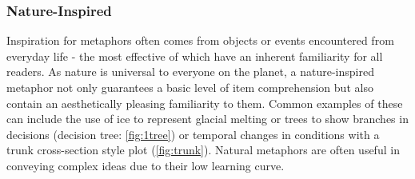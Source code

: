 \subsubsection{Nature-Inspired}\label{sec:metnat}

Inspiration for metaphors often comes from objects or events encountered from everyday life - the most effective of which have an inherent familiarity for all readers. As nature is universal to everyone on the planet, a nature-inspired metaphor not only guarantees a basic level of item comprehension but also contain an aesthetically pleasing familiarity to them. Common examples of these can include the use of ice to represent glacial melting or trees to show branches in decisions (decision tree: \autoref{fig:1tree}) or temporal changes in conditions with a trunk cross-section style plot (\autoref{fig:trunk}). Natural metaphors are often useful in conveying complex ideas due to their low learning curve.

